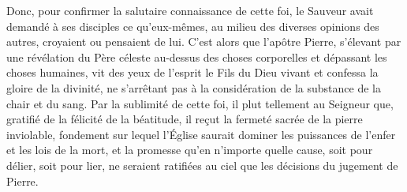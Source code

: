Donc, pour confirmer la salutaire connaissance de cette foi,
	le Sauveur avait demandé à ses disciples
	ce qu’eux-mêmes, au milieu des diverses opinions des autres,
	croyaient ou pensaient de lui.
C’est alors que l’apôtre Pierre,
	s’élevant par une révélation du Père céleste
		au-dessus des choses corporelles et dépassant les choses humaines,
	vit des yeux de l’esprit le Fils du Dieu vivant
	et confessa la gloire de la divinité,
	ne s’arrêtant pas à la considération de la substance de la chair et du sang.
Par la sublimité de cette foi, il plut tellement au Seigneur
	que, gratifié de la félicité de la béatitude,
	il reçut la fermeté sacrée de la pierre inviolable,
	fondement sur lequel l’Église saurait dominer les puissances de l’enfer
		et les lois de la mort,
	et la promesse qu’en n’importe quelle cause,
		soit pour délier, soit pour lier,
	ne seraient ratifiées au ciel que les décisions du jugement de Pierre.
